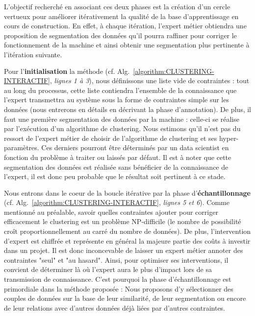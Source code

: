 		L'objectif recherché en associant ces deux phases est la création d'un cercle vertueux pour améliorer itérativement la qualité de la base d'apprentissage en cours de construction.
		En effet, à chaque itération, l'expert métier obtiendra une proposition de segmentation des données qu'il pourra raffiner pour corriger le fonctionnement de la machine et ainsi obtenir une segmentation plus pertinente à l'itération suivante.
		
		Pour l'\textbf{initialisation} la méthode (cf. Alg.~\ref{algorithm:CLUSTERING-INTERACTIF}, \textit{lignes 1 à 3}), nous définissons une liste vide de contraintes : tout au long du processus, cette liste contiendra l'ensemble de la connaissance que l'expert transmettra au système sous la forme de contraintes simple sur les données (nous entrerons en détails en décrivant la phase d'annotation).
		De plus, il faut une première segmentation des données par la machine : celle-ci se réalise par l'exécution d'un algorithme de clustering. Nous estimons qu'il n'est pas du ressort de l'expert métier de choisir de l'algorithme de clustering et ses hyper-paramètres. Ces derniers pourront être déterminés par un data scientist en fonction du problème à traiter ou laissés par défaut. Il est à noter que cette segmentation des données est réalisée sans bénéficier de la connaissance de l'expert, il est donc peu probable que le résultat soit pertinent à ce stade.
		
		Nous entrons dans le coeur de la boucle itérative par la phase d'\textbf{échantillonnage} (cf. Alg.~\ref{algorithm:CLUSTERING-INTERACTIF}, \textit{lignes 5 et 6}).
		Comme mentionné au préalable, savoir quelles contraintes ajouter pour corriger efficacement le clustering est un problème NP-difficile (le nombre de possibilité croît proportionnellement au carré du nombre de données). De plus, l'intervention d'expert est chiffrée et représente en général la majeure partie des coûts à investir dans un projet. Il est donc inconcevable de laisser un expert métier annoter des contraintes "seul" et "au hasard".
		Ainsi, pour optimiser ses interventions, il convient de déterminer là où l'expert aura le plus d'impact lors de sa transmission de connaissance. C'est pourquoi la phase d'échantillonnage est primordiale dans la méthode proposée : Nous proposons d'y sélectionner des couples de données sur la base de leur similarité, de leur segmentation ou encore de leur relations avec d'autres données déjà liées par d'autres contraintes.
		
